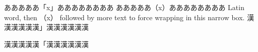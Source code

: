 \documentclass[pdflatex]{jlreq}
\begin{document}
\hsize=65pt \parindent=0pt
あああああ「x」ああああああああ
あああああ（x）ああああああああ
Latin word, then （x） followed by more text to force wrapping in this narrow box.
漢漢漢漢漢漢」漢漢漢漢漢漢

漢漢漢漢漢「漢漢漢漢漢漢
\end{document}
